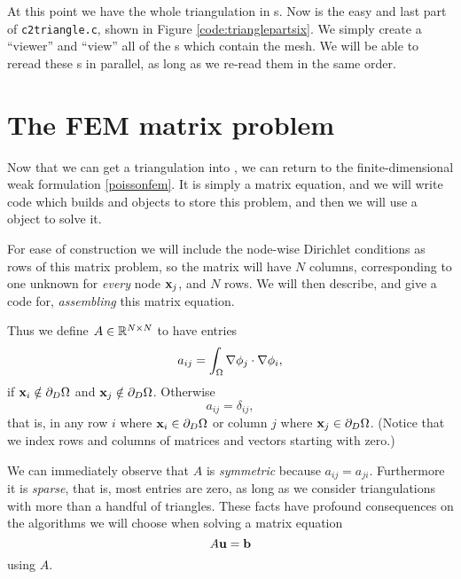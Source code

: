 
At this point we have the whole triangulation in \PETSc \pVec s.  Now is the easy and last part of \texttt{c2triangle.c}, shown in Figure \ref{code:trianglepartsix}.  We simply create a \PETSc ``viewer'' and ``view'' all of the \pVec s which contain the mesh.  We will be able to reread these \pVec s in parallel, as long as we re-read them in the same order.




\section{The FEM matrix problem}

Now that we can get a triangulation into \PETSc, we can return to the finite-dimensional weak formulation \eqref{poissonfem}.  It is simply a matrix equation, and we will write code which builds \PETSc \pMat and \pVec objects to store this problem, and then we will use a \PETSc \pKSP object to solve it.

For ease of construction we will include the node-wise Dirichlet conditions as rows of this matrix problem, so the matrix will have $N$ columns, corresponding to one unknown for \emph{every} node $\mathbf{x}_j$, and $N$ rows.  We will then describe, and give a code for, \emph{assembling} this matrix equation.

Thus we define $A \in \mathbb{R}^{N\times N}$ to have entries
\begin{equation*}
a_{ij} = \int_\Omega \nabla \phi_j \cdot \nabla \phi_i,
\end{equation*}
if $\mathbf{x}_i \notin \partial_D \Omega$ and $\mathbf{x}_j \notin \partial_D \Omega$.  Otherwise
\begin{equation*}
a_{ij} = \delta_{ij},
\end{equation*}
that is, in any row $i$ where $\mathbf{x}_i \in \partial_D \Omega$ or column $j$ where $\mathbf{x}_j \in \partial_D \Omega$.  (Notice that we index rows and columns of matrices and vectors starting with zero.)

We can immediately observe that $A$ is \emph{symmetric} because $a_{ij}=a_{ji}$.  Furthermore it is \emph{sparse}, that is, most entries are zero, as long as we consider triangulations with more than a handful of triangles.  These facts have profound consequences on the algorithms we will choose when solving a matrix equation
\begin{equation}
A \mathbf{u} = \mathbf{b} \label{poissonmatrix}
\end{equation}
using $A$.

